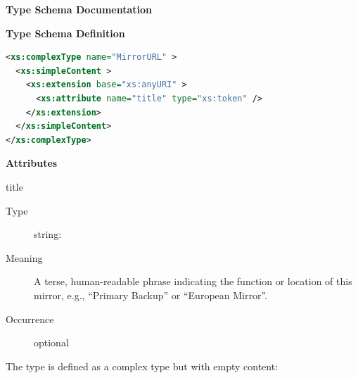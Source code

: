 \documentclass[11pt,a4paper]{ivoa}
\begin{document}
\begin{generated}
\begingroup
      	\renewcommand*\descriptionlabel[1]{%
      	\hbox to 5.5em{\emph{#1}\hfil}}\vspace{2ex}\noindent\textbf{ Type Schema Documentation}


\vspace{1ex}\noindent\textbf{ Type Schema Definition}

\begin{lstlisting}[language=XML,basicstyle=\footnotesize]
<xs:complexType name="MirrorURL" >
  <xs:simpleContent >
    <xs:extension base="xs:anyURI" >
      <xs:attribute name="title" type="xs:token" />
    </xs:extension>
  </xs:simpleContent>
</xs:complexType>
\end{lstlisting}

\vspace{0.5ex}\noindent\textbf{ Attributes}

\begingroup\small\begin{bigdescription}
\item[title]
\begin{description}
\item[Type] string: 
\item[Meaning] 
                  A terse, human-readable phrase indicating the function
                  or location of this mirror, e.g., “Primary Backup” or
                  “European Mirror”.
               
\item[Occurrence] optional
\end{description}


\end{bigdescription}\endgroup

\endgroup
\end{generated}



The  type is
defined as a complex type but with empty content:
\end{document}
